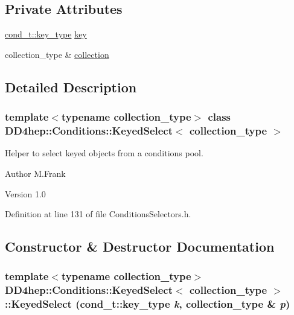 \subsection*{Private Attributes}
\begin{DoxyCompactItemize}
\item 
\hyperlink{class_d_d4hep_1_1_conditions_1_1_condition_a7528efa762e8cc072ef80ea67c3531f9}{cond\_\-t::key\_\-type} \hyperlink{class_d_d4hep_1_1_conditions_1_1_keyed_select_aaa2b0dfe26393c92a82ff5c203c5398e}{key}
\item 
collection\_\-type \& \hyperlink{class_d_d4hep_1_1_conditions_1_1_keyed_select_ace147c1925f1b99fd5582e1a251e6bbd}{collection}
\end{DoxyCompactItemize}


\subsection{Detailed Description}
\subsubsection*{template$<$typename collection\_\-type$>$ class DD4hep::Conditions::KeyedSelect$<$ collection\_\-type $>$}

Helper to select keyed objects from a conditions pool. \begin{DoxyAuthor}{Author}
M.Frank 
\end{DoxyAuthor}
\begin{DoxyVersion}{Version}
1.0 
\end{DoxyVersion}


Definition at line 131 of file ConditionsSelectors.h.

\subsection{Constructor \& Destructor Documentation}
\hypertarget{class_d_d4hep_1_1_conditions_1_1_keyed_select_a4158acaaf6c6911619a41d39fe92d247}{
\subsubsection[{KeyedSelect}]{\setlength{\rightskip}{0pt plus 5cm}template$<$typename collection\_\-type$>$ {\bf DD4hep::Conditions::KeyedSelect}$<$ collection\_\-type $>$::{\bf KeyedSelect} ({\bf cond\_\-t::key\_\-type} {\em k}, \/  collection\_\-type \& {\em p})}}
\label{class_d_d4hep_1_1_conditions_1_1_keyed_select_a4158acaaf6c6911619a41d39fe92d247}


